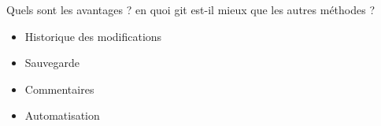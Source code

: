 \documentclass[usenames,dvipsnames]{beamer}
\begin{document}
\begin{frame}{Quels sont les avantages ?}
		en quoi git est-il mieux que les autres méthodes ?
			\begin{itemize}
				\item <1-> Historique des modifications
				\item <2-> Sauvegarde
				\item <3-> Commentaires
				\item <4-> Automatisation
			\end{itemize}
\end{frame}
	
	
\end{document}
